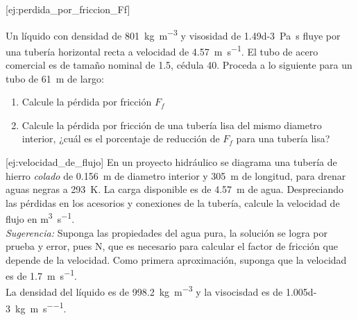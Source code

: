 \documentclass{AsignaturaResumen}
\begin{document}
[ej:perdida_por_friccion_Ff]{
    Un líquido con densidad de \qty{801}{\kg\per\m\cubed} y visosidad de \qty{1.49d-3}{\pascal\s} fluye por una tubería horizontal recta a velocidad de \qty{4.57}{\m\per\s}. El tubo de acero comercial es de tamaño nominal de \qty{1.5}{\in}, cédula 40. Proceda a lo siguiente para un tubo de \qty{61}{\m} de largo:
    \begin{enumerate}
        \item Calcule la pérdida por fricción $F_{f}$
        \item Calcule la pérdida por fricción de una tubería lisa del mismo diametro interior, ¿cuál es el porcentaje de reducción de $F_{f}$ para una tubería lisa?
    \end{enumerate}
}

[ej:velocidad_de_flujo]{
    En un proyecto hidráulico se diagrama una tubería de hierro \emph{colado} de \qty{0.156}{\m} de diametro interior y \qty{305}{\m} de longitud, para drenar aguas negras a \qty{293}{\K}. La carga disponible es de \qty{4.57}{\m} de agua. Despreciando las pérdidas en los acesorios y conexiones de la tubería, calcule la velocidad de flujo en \unit{\m\cubed\per\s}. \\
    \emph{Sugerencia:} Suponga las propiedades del agua pura, la solución se logra por prueba y error, pues N, que es necesario para calcular el factor de fricción que depende de la velocidad. Como primera aproximación, suponga que la velocidad es de \qty{1.7}{\m\per\s}. \\
    La densidad del líquido es de \qty{998.2}{\kg\per\m\cubed} y la visocisdad es de \qty{1.005d-3}{\kg\per\m\per\s}.
}





\ifx\ISMAIN\undefined
    
\end{document}

